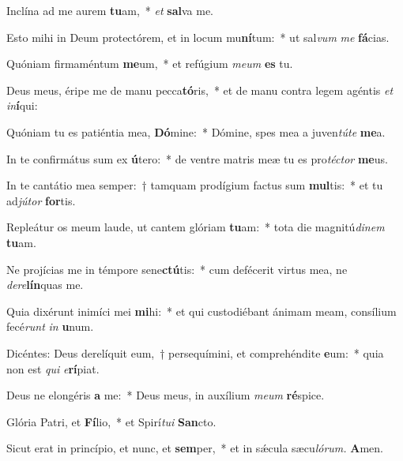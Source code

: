 \item Inclína ad me aurem \textbf{tu}am,~* \textit{et} \textbf{sal}va me.
\item Esto mihi in Deum prote\-ctórem, et in locum mu\textbf{ní}tum:~* ut sal\textit{vum} \textit{me} \textbf{fá}cias.
\item Quóniam firmaméntum \textbf{me}um,~* et refúgium \textit{meum} \textbf{es} tu.
\item Deus meus, éripe me de manu pecca\textbf{tó}ris,~* et de manu contra legem agéntis \textit{et} \textit{in}\textbf{í}qui:
\item Quóniam tu es patiéntia mea, \textbf{Dó}mine:~* Dómine, spes mea a juven\textit{túte} \textbf{me}a.
\item In te confirmátus sum ex \textbf{ú}tero:~* de ventre matris meæ tu es pro\hspace{0.03em}\textit{téctor} \textbf{me}us.
\item In te cantátio mea semper:~† tamquam prodígium factus sum \textbf{mul}tis:~* et tu ad\textit{jútor} \textbf{for}tis.
\item Repleátur os meum laude, ut cantem glóriam \textbf{tu}am:~* tota die magnitú\hspace{0.02em}\textit{dinem} \textbf{tu}am.
\item Ne projícias me in témpore sene\textbf{ctú}tis:~* cum defécerit virtus mea, ne \textit{dere}\textbf{lín}quas me.
\item Quia dixérunt inimíci mei \textbf{mi}hi:~* et qui custodiébant ánimam meam, consílium fecé\hspace{0.03em}\textit{runt} \textit{in} \textbf{u}num.
\item Dicéntes: Deus derelíquit eum,~† persequímini, et comprehéndite \textbf{e}um:~* quia non est \textit{qui} \textit{e}\textbf{rí}piat.
\item Deus ne elongéris \textbf{a} me:~* Deus meus, in auxílium \textit{meum} \textbf{ré}spice.
\item Glória Patri, et \textbf{Fí}lio,~* et Spirí\hspace{0.03em}\textit{tui} \textbf{San}cto.
\item Sicut erat in princípio, et nunc, et \textbf{sem}per,~* et in sǽcula sæcu\hspace{0.03em}\textit{lórum.} \textbf{A}men.

